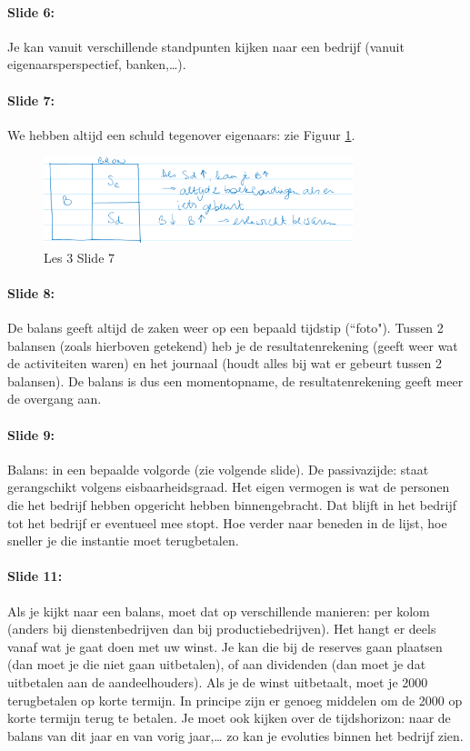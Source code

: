 \documentclass[10pt,a4paper]{report}
\begin{document}
\paragraph{Slide 6:} Je kan vanuit verschillende standpunten kijken naar een bedrijf (vanuit eigenaarsperspectief, banken,…).

\paragraph{Slide 7:} We hebben altijd een schuld tegenover eigenaars: zie Figuur \ref{les03_01}.

\begin{figure}[h!]
\centering
\includegraphics[width=90mm]{Les03_01.png}
\caption{Les 3 Slide 7} 
\label{les03_01}
\end{figure}

\paragraph{Slide 8:} De balans geeft altijd de zaken weer op een bepaald tijdstip (``foto"). Tussen 2 balansen (zoals hierboven getekend) heb je de resultatenrekening (geeft weer wat de activiteiten waren) en het journaal (houdt alles bij wat er gebeurt tussen 2 balansen). De balans is dus een momentopname, de resultatenrekening geeft meer de overgang aan.

\paragraph{Slide 9:} Balans: in een bepaalde volgorde (zie volgende slide). De passivazijde: staat gerangschikt volgens eisbaarheidsgraad. Het eigen vermogen is wat de personen die het bedrijf hebben opgericht hebben binnengebracht. Dat blijft in het bedrijf tot het bedrijf er eventueel mee stopt. Hoe verder naar beneden in de lijst, hoe sneller je die instantie moet terugbetalen.

\paragraph{Slide 11:} Als je kijkt naar een balans, moet dat op verschillende manieren: per kolom (anders bij dienstenbedrijven dan bij productiebedrijven). Het hangt er deels vanaf wat je gaat doen met uw winst. Je kan die bij de reserves gaan plaatsen (dan moet je die niet gaan uitbetalen), of aan dividenden (dan moet je dat uitbetalen aan de aandeelhouders). Als je de winst uitbetaalt, moet je 2000 terugbetalen op korte termijn. In principe zijn er genoeg middelen om de 2000 op korte termijn terug te betalen.
Je moet ook kijken over de tijdshorizon: naar de balans van dit jaar en van vorig jaar,… zo kan je evoluties binnen het bedrijf zien.
\end{document}
